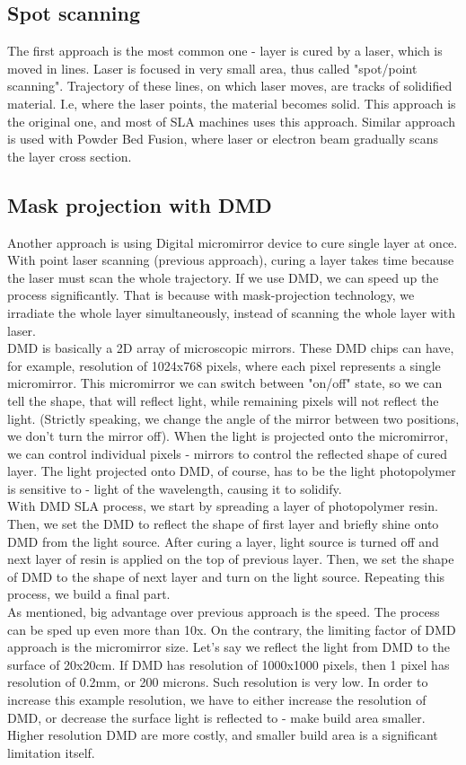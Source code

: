 \documentclass[a4paper, twoside, 11pt]{report}
\begin{document}
\subsection{Spot scanning}
The first approach is the most common one - layer is cured by a laser, which is moved in lines. Laser is focused in very small area, thus called "spot/point scanning". Trajectory of these lines, on which laser moves, are tracks of solidified material. I.e, where the laser points, the material becomes solid. This approach is the original one, and most of SLA machines uses this approach. Similar approach is used with  Powder Bed Fusion, where laser or electron beam gradually scans the layer cross section.
\subsection{Mask projection with DMD}
Another approach is using Digital micromirror device to cure single layer at once. With point laser scanning (previous approach), curing a layer takes time because the laser must scan the whole trajectory. If we use DMD, we can speed up the process significantly. That is because with mask-projection technology, we irradiate the whole layer simultaneously, instead of scanning the whole layer with laser.\\
DMD is basically a 2D array of microscopic mirrors. These DMD chips can have, for example, resolution of 1024x768 pixels, where each pixel represents a single micromirror. This micromirror we can switch between "on/off" state, so we can tell the shape, that will reflect light, while remaining pixels will not reflect the light. (Strictly speaking, we change the angle of the mirror between two positions, we don't turn the mirror off). When the light is projected onto the micromirror, we can control individual pixels - mirrors to control the reflected shape of cured layer. The light projected onto DMD, of course, has to be the light photopolymer is sensitive to - light of the wavelength, causing it to solidify.\\
With DMD SLA process, we start by spreading a layer of photopolymer resin. Then, we set the DMD to reflect the shape of first layer and briefly shine onto DMD from the light source. After curing a layer, light source is turned off and next layer of resin is applied on the top of previous layer. Then, we set the shape of DMD to the shape of next layer and turn on the light source. Repeating this process, we build a final part.\\
As mentioned, big advantage over previous approach is the speed. The process can be sped up even more than 10x. On the contrary, the limiting factor of DMD approach is the micromirror size. Let's say we reflect the light from DMD to the surface of 20x20cm. If DMD has resolution of 1000x1000 pixels, then 1 pixel has resolution of 0.2mm, or 200 microns. Such resolution is very low. In order to increase this example resolution, we have to either increase the resolution of DMD, or decrease the surface light is reflected to - make build area smaller. Higher resolution DMD are more costly, and smaller build area is a significant limitation itself.\\
\end{document}
